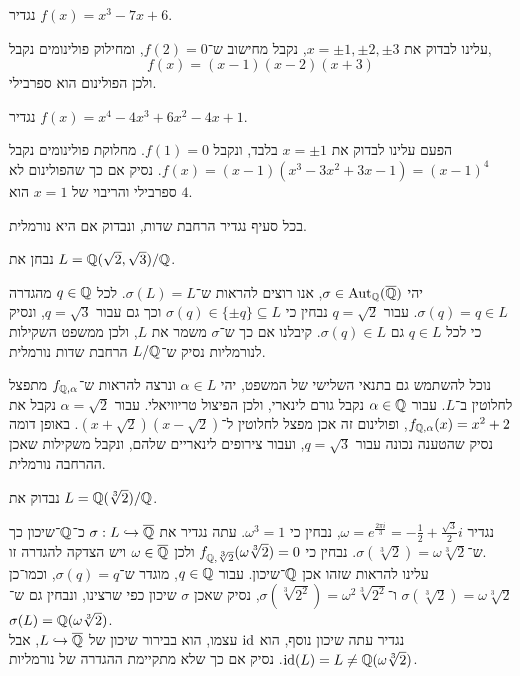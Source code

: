 \subquestion{}
נגדיר $f(x) = x^3 - 7x + 6$.
\begin{solution}
	עלינו לבדוק את $x = \pm 1, \pm 2, \pm 3$,
	נקבל מחישוב ש־$f(2) = 0$, ומחילוק פולינומים נקבל,
	\[
		f(x)
		= (x - 1) (x - 2) (x + 3)
	\]
	ולכן הפולינום הוא ספרבילי.
\end{solution}

\subquestion{}
נגדיר $f(x) = x^4 - 4x^3 + 6x^2 - 4x + 1$.
\begin{solution}
	הפעם עלינו לבדוק את $x = \pm 1$ בלבד, ונקבל $f(1) = 0$.
	מחלוקת פולינומים נקבל $f(x) = (x - 1)(x^3 - 3x^2 + 3x - 1) = {(x - 1)}^4$.
	נסיק אם כך שהפולינום לא ספרבילי והריבוי של $x = 1$ הוא $4$.
\end{solution}

\question{}
בכל סעיף נגדיר הרחבת שדות, ונבדוק אם היא נורמלית.

\subquestion{}
נבחן את $L = \mathbb{Q}(\sqrt{2}, \sqrt{3}) / \mathbb{Q}$.
\begin{solution}
	יהי $\sigma \in \operatorname{Aut}_{\mathbb{Q}}(\overline{\mathbb{Q}})$, אנו רוצים להראות ש־$\sigma(L) = L$.
	לכל $q \in \mathbb{Q}$ מהגדרה $\sigma(q) = q \in L$.
	עבור $q = \sqrt{2}$ נבחין כי $\sigma(q) \in \{ \pm q \} \subseteq L$ וכך גם עבור $q = \sqrt{3}$, ונסיק כי לכל $q \in L$ גם $\sigma(q) \in L$.
	קיבלנו אם כך ש־$\sigma$ משמר את $L$, ולכן ממשפט השקילות לנורמליות נסיק ש־$L / \mathbb{Q}$ הרחבת שדות נורמלית.

	נוכל להשתמש גם בתנאי השלישי של המשפט, יהי $\alpha \in L$ ונרצה להראות ש־$f_{\mathbb{Q}, \alpha}$ מתפצל לחלוטין ב־$L$.
	עבור $\alpha \in \mathbb{Q}$ נקבל גורם לינארי, ולכן הפיצול טריוויאלי.
	עבור $\alpha = \sqrt{2}$ נקבל את $f_{\mathbb{Q}, \alpha}(x) = x^2 + 2$, ופולינום זה אכן מפצל לחלוטין ל־$(x + \sqrt{2})(x - \sqrt{2})$.
	באופן דומה נסיק שהטענה נכונה עבור $q = \sqrt{3}$, ועבור צירופים לינאריים שלהם, ונקבל משקילות שאכן ההרחבה נורמלית.
\end{solution}

\subquestion{}
נבדוק את $L = \mathbb{Q}(\sqrt[3]{2}) / \mathbb{Q}$.
\begin{solution}
	נגדיר $\omega = e^{\frac{2\pi i}{3}} = -\frac{1}{2} + \frac{\sqrt{3}}{2} i$, נבחין כי $\omega^3 = 1$.
	עתה נגדיר את $\sigma : L \hookrightarrow \overline{\mathbb{Q}}$ כ־$\mathbb{Q}$־שיכון כך ש־$\sigma(\sqrt[3]{2}) = \omega \sqrt[3]{2}$.
	נבחין כי $f_{\mathbb{Q}, \sqrt[3]{2}}(\omega \sqrt[3]{2}) = 0$ ולכן $\omega \in \overline{\mathbb{Q}}$ ויש הצדקה להגדרה זו. \\
	עלינו להראות שזהו אכן $\mathbb{Q}$־שיכון.
	עבור $q \in \mathbb{Q}$, מוגדר ש־$\sigma(q) = q$, וכמו־כן $\sigma(\sqrt[3]{2}) = \omega \sqrt[3]{2}$ ו־$\sigma(\sqrt[3]{2^2}) = \omega^2 \sqrt[3]{2^2}$,
	נסיק שאכן $\sigma$ שיכון כפי שרצינו, ונבחין גם ש־$\sigma(L) = \mathbb{Q}(\omega \sqrt[3]{2})$. \\
	נגדיר עתה שיכון נוסף, הוא $\operatorname{id}$ עצמו, הוא בבירור שיכון של $L \hookrightarrow \overline{\mathbb{Q}}$, אבל $\operatorname{id}(L) = L \ne \mathbb{Q}(\omega \sqrt[3]{2})$.
	נסיק אם כך שלא מתקיימת ההגדרה של נורמליות.
\end{solution}

